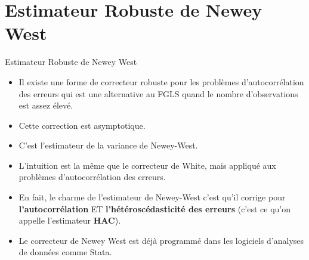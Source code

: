 \documentclass{beamer}
\begin{document}
\section{Estimateur Robuste de Newey West}

\frame{\tableofcontents[current]}


\begin{frame}{Estimateur Robuste de Newey West}
\begin{itemize}
\item Il existe une forme de correcteur robuste pour les problèmes d’autocorrélation des erreurs qui est une alternative au FGLS quand le nombre d’observations est assez élevé.
\item Cette correction est asymptotique.
\item C’est l’estimateur de la variance de Newey-West. 
\item L’intuition est la même que le correcteur de White, mais appliqué aux problèmes d’autocorrélation des erreurs.
\item En fait, le charme de l’estimateur de Newey-West c’est qu’il corrige pour \textbf{l’autocorrélation} ET \textbf{l’hétéroscédasticité des erreurs} (c’est ce qu’on appelle l’estimateur \textbf{HAC}).
\item Le correcteur de Newey West est déjà programmé dans les logiciels d’analyses de données comme Stata.
\end{itemize}
\end{frame}
\end{document}
